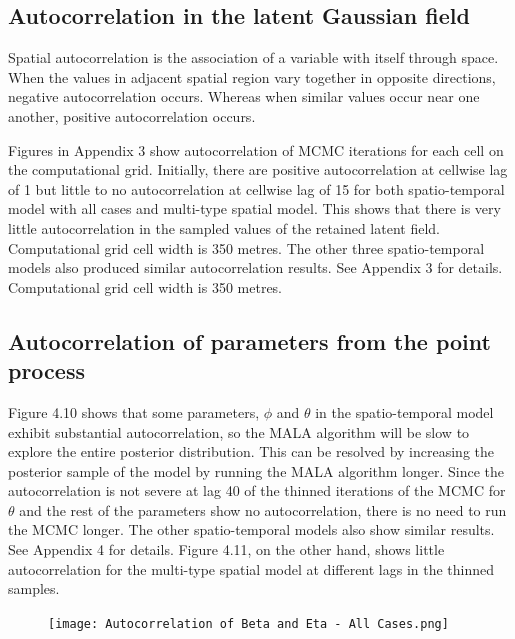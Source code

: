 \documentclass[12pt,a4paper]{report}
\begin{document}
\subsection{Autocorrelation in the latent Gaussian field}

Spatial autocorrelation is the association of a variable with itself through space. When the values in adjacent spatial region vary together in opposite directions, negative autocorrelation occurs. Whereas when similar values occur near one another, positive autocorrelation occurs.

Figures in Appendix 3 show autocorrelation of MCMC iterations for each cell on the computational grid. Initially, there are positive autocorrelation at cellwise lag of 1 but little to no autocorrelation at cellwise lag of 15 for both spatio-temporal model with all cases and multi-type spatial model. This shows that there is very little autocorrelation in the sampled values of the retained latent field.  Computational grid cell width is 350 metres. The other three spatio-temporal models also produced similar autocorrelation results. See Appendix 3 for details.  Computational grid cell width is 350 metres. 

\subsection{Autocorrelation of parameters from the point process}

Figure 4.10 shows that some parameters, $\phi$ and $\theta$ in the spatio-temporal model exhibit substantial autocorrelation, so the MALA algorithm will be slow to explore the entire posterior distribution. This can be resolved by increasing the posterior sample of the model by running the MALA algorithm longer. Since the autocorrelation is not severe at lag 40 of the thinned iterations of the MCMC for $\theta$ and the rest of the parameters show no autocorrelation, there is no need to run the MCMC longer. The other spatio-temporal models also show similar results. See Appendix 4 for  details. Figure 4.11, on the other hand, shows little autocorrelation for the multi-type spatial model at different lags in the thinned samples.

\begin{figure}[h]
\begin{center}
\texttt{[image: Autocorrelation of Beta and Eta - All Cases.png]}
\end{center} 
\end{figure}
\end{document}
